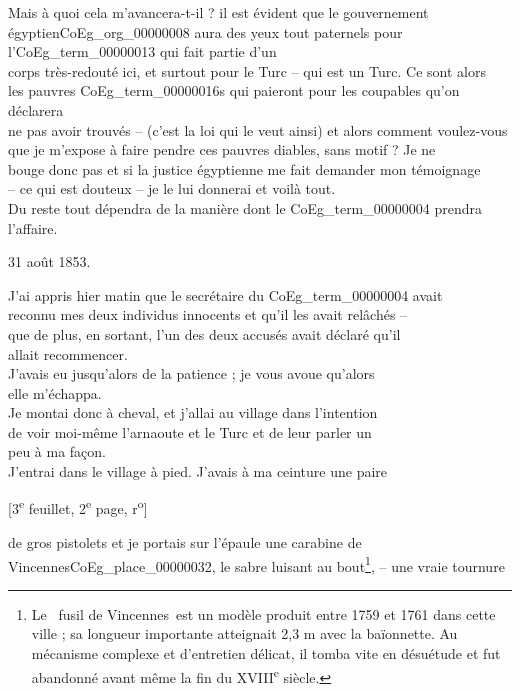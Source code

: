\documentclass{book}
\begin{document}
Mais à quoi cela m’avancera-t-il ? il est évident que le gouvernement\\
égyptien\gls{CoEg_org_00000008} aura des yeux tout paternels pour l’\gls{CoEg_term_00000013} qui fait partie d’un\\
corps très-redouté ici, et surtout pour le Turc – qui est un Turc. Ce sont alors\\
les pauvres \Glspl{CoEg_term_00000016} qui paieront pour les coupables qu’on déclarera\\
ne pas avoir trouvés – (c’est la loi qui le veut ainsi) et alors comment voulez-vous\\
que je m’expose à faire pendre ces pauvres diables, sans motif ? Je ne\\
bouge donc pas et si la justice égyptienne me fait demander mon témoignage\\
– ce qui est douteux – je le lui donnerai et voilà tout.\\
\indent Du reste tout dépendra de la manière dont le \Gls{CoEg_term_00000004} prendra l’affaire.
\begin{flushright}31 août 1853.\end{flushright}
\indent J’ai appris hier matin que le secrétaire du \Gls{CoEg_term_00000004} avait\\
reconnu mes deux individus innocents et qu’il les avait relâchés –\\
que de plus, en sortant, l’un des deux accusés avait déclaré qu’il\\
allait recommencer.\\
\indent J’avais eu jusqu’alors de la patience ; je vous avoue qu’alors\\
elle m’échappa.\\
\indent Je montai donc à cheval, et j’allai au village dans l’intention\\
de voir moi-même l’arnaoute et le Turc et de leur parler un\\
peu à ma façon.\\
\indent J’entrai dans le village à pied. J’avais à ma ceinture une paire
{\footnotesize\begin{center} {[3\textsuperscript{e} feuillet, 2\textsuperscript{e} page, r\textsuperscript{o}]}\end{center}}
\noindent de gros pistolets et je portais sur l’épaule une carabine de\\
Vincennes\gls{CoEg_place_00000032}, le sabre luisant au bout\footnote{Le \og ~fusil de Vincennes~\fg est un modèle produit entre 1759 et 1761 dans cette ville ; sa longueur importante atteignait 2,3 m avec la baïonnette. Au mécanisme complexe et d'entretien délicat, il tomba vite en désuétude et fut abandonné avant même la fin du XVIII\textsuperscript{e} siècle.}, – une vraie tournure\\
\end{document}

